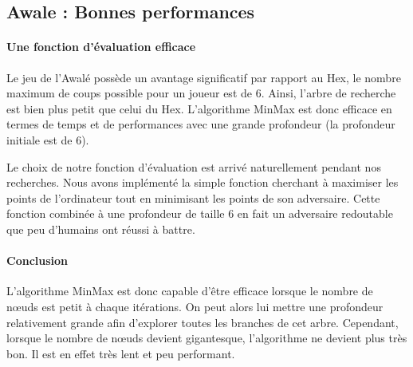 


\subsection {Awale : Bonnes performances}
\paragraph {Une fonction d'évaluation efficace} Le jeu de l'Awalé possède un avantage significatif par rapport au Hex, le nombre maximum de coups 
possible pour un joueur est de 6. Ainsi, l'arbre de recherche est bien plus petit que celui du Hex. L'algorithme MinMax est donc efficace en termes de 
temps et de performances avec une grande profondeur (la profondeur initiale est de 6). 

Le choix de notre fonction d'évaluation est arrivé naturellement pendant nos recherches. Nous avons implémenté la simple fonction cherchant à
maximiser les points de l'ordinateur tout en minimisant les points de son adversaire. Cette fonction combinée à une profondeur de taille 6 en fait un 
adversaire redoutable que peu d'humains ont réussi à battre.

\paragraph {Conclusion} L'algorithme MinMax est donc capable d'être efficace lorsque le nombre de nœuds est petit à chaque itérations. On peut alors 
lui mettre une profondeur relativement grande afin d'explorer toutes les branches de cet arbre. Cependant, lorsque le nombre de nœuds devient gigantesque,
l'algorithme ne devient plus très bon. Il est en effet très lent et peu performant.